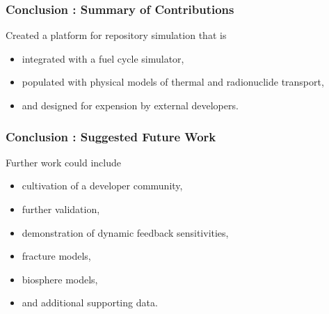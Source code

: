 
\begin{frame}[ctb!]
  \frametitle{Conclusion : Summary of Contributions}
  Created a platform for repository simulation that is
  \begin{itemize}
  \item integrated with a fuel cycle simulator,
  \item populated with physical models of thermal and radionuclide transport,
  \item and designed for expension by external developers.
  \end{itemize}
\end{frame}

\begin{frame}[ctb!]
  \frametitle{Conclusion : Suggested Future Work}
  Further work could include
  \begin{itemize}
  \item cultivation of a developer community,
  \item further validation,
  \item demonstration of dynamic feedback sensitivities,
  \item fracture models,
  \item biosphere models,
  \item and additional supporting data.
  \end{itemize}
\end{frame}

